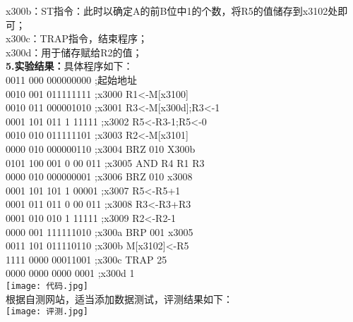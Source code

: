 \documentclass[12pt]{ctexart}
\begin{document}
x300b：ST指令：此时以确定A的前B位中1的个数，将R5的值储存到x3102处即可；\\
x300c：TRAP指令，结束程序；\\
x300d：用于储存赋给R2的值；\\
{\bf5.实验结果：}具体程序如下：\\
0011 000 000000000    ;起始地址 \\
0010 001 011111111    ;x3000 R1<-M[x3100]  \\
0010 011 000001010    ;x3001 R3<-M[x300d];R3<-1\\
0001 101 011 1 11111  ;x3002 R5<-R3-1;R5<-0\\
0010 010 011111101    ;x3003 R2<-M[x3101]\\
0000 010 000000110    ;x3004 BRZ 010 X300b\\
0101 100 001 0 00 011 ;x3005 AND R4 R1 R3\\
0000 010 000000001    ;x3006 BRZ 010 x3008\\
0001 101 101 1 00001  ;x3007 R5<-R5+1\\
0001 011 011 0 00 011 ;x3008 R3<-R3+R3\\
0001 010 010 1 11111  ;x3009 R2<-R2-1 \\
0000 001 111111010    ;x300a BRP 001 x3005\\
0011 101 011110110    ;x300b M[x3102]<-R5\\
1111 0000 00011001    ;x300c TRAP 25\\
0000 0000 0000 0001   ;x300d 1\\
\texttt{[image: 代码.jpg]}\\
根据自测网站，适当添加数据测试，评测结果如下：\\
\texttt{[image: 评测.jpg]}\\
\end{document}
